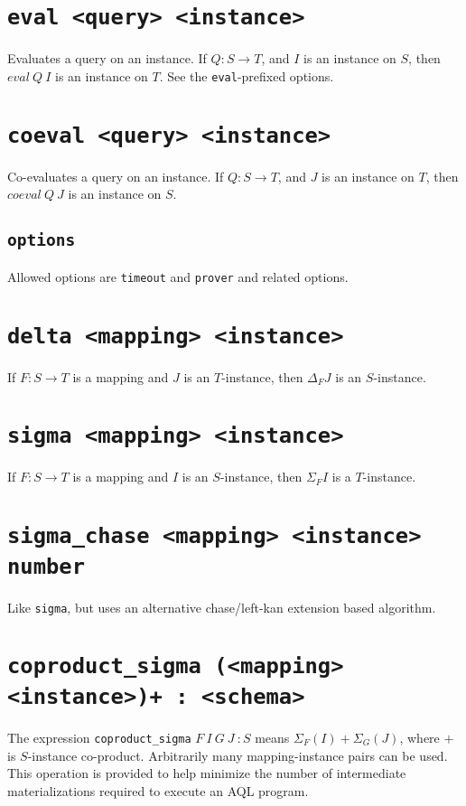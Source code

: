 \documentclass[10pt]{book}
\begin{document}
\section{{\tt eval <query> <instance>}}
Evaluates a query on an instance.  If $Q : S \to T$, and $I$ is an instance on $S$, then $eval \ Q \ I$ is an instance on $T$.
See the {\tt eval}-prefixed options.

\section{{\tt coeval <query> <instance>}}
Co-evaluates a query on an instance.  If $Q : S \to T$, and $J$ is an instance on $T$, then $coeval \ Q \ J$ is an instance on $S$.
\subsection{\tt options}
Allowed options are {\tt timeout} and {\tt prover} and related options.

\section{{\tt delta <mapping> <instance>}}
If $F : S \to T$ is a mapping and $J$ is an $T$-instance, then $\Delta_F J$ is an $S$-instance. 

\section{{\tt sigma <mapping> <instance>}}
If $F : S \to T$ is a mapping and $I$ is an $S$-instance, then $\Sigma_F I$ is a $T$-instance. 

\section{{\tt sigma\_chase <mapping> <instance> number}}
Like {\tt sigma}, but uses an alternative chase/left-kan extension based algorithm.

\section{{\tt coproduct\_sigma (<mapping> <instance>)+ : <schema>}}
The expression {\tt coproduct\_sigma}  $F \ I \ G \ J \ : S$ means $\Sigma_F(I) + \Sigma_G(J)$, where $+$ is $S$-instance co-product.  Arbitrarily many mapping-instance pairs can be used.  This operation is provided to help minimize the number of intermediate materializations required to execute an AQL program.
\end{document}
